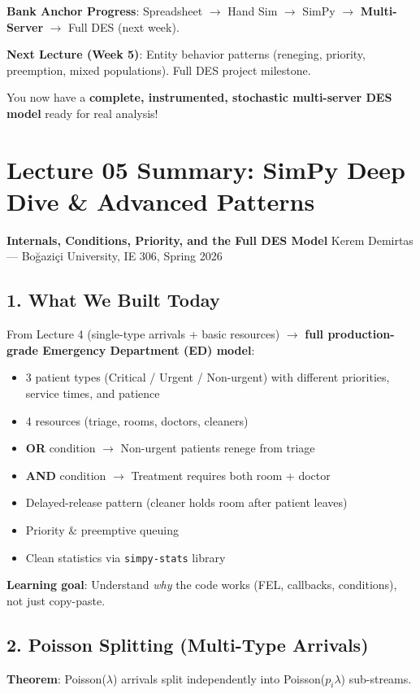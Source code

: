 \documentclass[11pt]{article}
\begin{document}
\textbf{Bank Anchor Progress}: Spreadsheet $\rightarrow$ Hand Sim $\rightarrow$ SimPy $\rightarrow$ \textbf{Multi-Server} $\rightarrow$ Full DES (next week).

\textbf{Next Lecture (Week 5)}: Entity behavior patterns (reneging, priority, preemption, mixed populations). Full DES project milestone.

You now have a \textbf{complete, instrumented, stochastic multi-server DES model} ready for real analysis!

\section*{Lecture 05 Summary: SimPy Deep Dive \& Advanced Patterns}
\textbf{Internals, Conditions, Priority, and the Full DES Model}
Kerem Demirtas --- Boğaziçi University, IE 306, Spring 2026

\subsection*{1. What We Built Today}
From Lecture 4 (single-type arrivals + basic resources) $\rightarrow$ \textbf{full production-grade Emergency Department (ED) model}:
\begin{itemize}[leftmargin=*]
\item 3 patient types (Critical / Urgent / Non-urgent) with different priorities, service times, and patience
\item 4 resources (triage, rooms, doctors, cleaners)
\item \textbf{OR} condition $\rightarrow$ Non-urgent patients renege from triage
\item \textbf{AND} condition $\rightarrow$ Treatment requires both room + doctor
\item Delayed-release pattern (cleaner holds room after patient leaves)
\item Priority \& preemptive queuing
\item Clean statistics via \texttt{simpy-stats} library
\end{itemize}

\textbf{Learning goal}: Understand \textit{why} the code works (FEL, callbacks, conditions), not just copy-paste.

\subsection*{2. Poisson Splitting (Multi-Type Arrivals)}
\textbf{Theorem}: Poisson($\lambda$) arrivals split independently into Poisson($p_i\lambda$) sub-streams.
\end{document}

